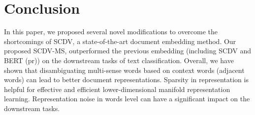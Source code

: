 \documentclass{ecai}
\newcommand{\method}{SCDV-MS}
\begin{document}
\section{Conclusion}
\label{sec:conclusions}
In this paper, we proposed several novel modifications to overcome the shortcomings of SCDV, a  state-of-the-art document embedding method. Our proposed \method{}, outperformed the previous embedding (including SCDV and BERT (pr)) on the downstream tasks of text classification. Overall, we have shown that disambiguating multi-sense words based on context words (adjacent words) can lead to better document representations. Sparsity in representation is helpful for effective and efficient lower-dimensional manifold representation learning. Representation noise in words level can have a significant impact on the downstream tasks. 




\end{document}
